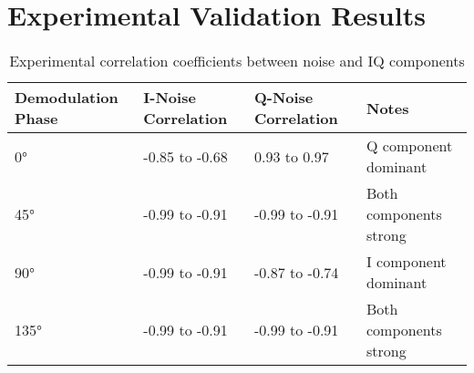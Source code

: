 \documentclass{article}
\begin{document}
\section{Experimental Validation Results}

\begin{table}[H]
\centering
\begin{tabular}{llll}
\toprule
Demodulation Phase & I-Noise Correlation & Q-Noise Correlation & Notes \\
\midrule
0° & -0.85 to -0.68 & 0.93 to 0.97 & Q component dominant \\
45° & -0.99 to -0.91 & -0.99 to -0.91 & Both components strong \\
90° & -0.99 to -0.91 & -0.87 to -0.74 & I component dominant \\
135° & -0.99 to -0.91 & -0.99 to -0.91 & Both components strong \\
\bottomrule
\end{tabular}
\caption{Experimental correlation coefficients between noise and IQ components}
\end{table}
\end{document}
